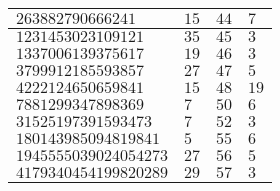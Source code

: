 \begin{table}[!htbp]
\begin{tabular}{|l|l|l|l|}
$263882790666241$ & $15$ & $44$ & $7$ \\ \hline
$1231453023109121$ & $35$ & $45$ & $3$ \\ \hline
$1337006139375617$ & $19$ & $46$ & $3$ \\ \hline
$3799912185593857$ & $27$ & $47$ & $5$ \\ \hline
$4222124650659841$ & $15$ & $48$ & $19$ \\ \hline
$7881299347898369$ & $7$ & $50$ & $6$ \\ \hline
$31525197391593473$ & $7$ & $52$ & $3$ \\ \hline
$180143985094819841$ & $5$ & $55$ & $6$ \\ \hline
$1945555039024054273$ & $27$ & $56$ & $5$ \\ \hline
$4179340454199820289$ & $29$ & $57$ & $3$ \\ \hline
\end{tabular}
\end{table}


